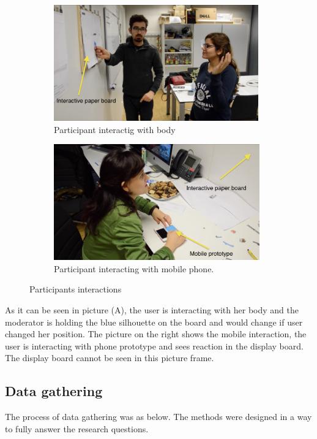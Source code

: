 \begin{figure}[H]
    \centering
    \begin{subfigure}[H]{0.48\textwidth}
        \centering
        \includegraphics[width=\textwidth,height=5cm]{Figures/5/body}
        \caption{Participant interactig with body}
        \label{fig:screen_proto_inter}
    \end{subfigure}
    \begin{subfigure}[H]{0.48\textwidth}
        \centering
        \includegraphics[width=\textwidth,height=5cm]{Figures/5/mobile}
        \caption{Participant interacting with mobile phone.}
        \label{fig:mobileproto_inter}
    \end{subfigure}
    \caption{Participants interactions}
    \label{fig:paper_prototype_screen}
\end{figure}

As it can be seen in picture (A), the user is interacting with her body and the moderator is holding the blue silhouette on the board and would change if user changed her position. The picture on the right shows the mobile interaction, the user is interacting with phone prototype and sees reaction in the display board. The display board cannot be seen in this picture frame.

\subsection{Data gathering}
The process of data gathering was as below. The methods were designed in a way to fully answer the research questions.


